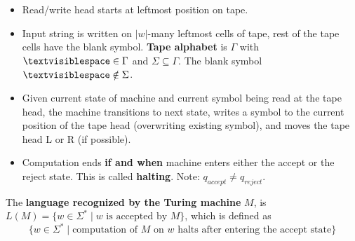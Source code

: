 \documentclass[12pt, oneside]{article}
\begin{document}
\vspace{-10pt}

\begin{itemize}
\setlength{\itemsep}{0pt}
\item Read/write head starts at leftmost position on tape. 
\item Input string is written on $|w|$-many leftmost cells of tape, 
rest of  the tape cells have  the blank symbol. {\bf Tape alphabet} 
is $\Gamma$ with $\textvisiblespace\in \Gamma$ and $\Sigma \subseteq \Gamma$.
The blank symbol $\textvisiblespace \notin \Sigma$.
\item Given current state of machine and current symbol being read at the tape head, 
the machine transitions to next state, writes a symbol to the current position  of the 
tape  head (overwriting existing symbol), and moves the tape head L or R (if possible). 
\item Computation ends {\bf if and when} machine enters either the accept or the reject state.
This is called {\bf halting}.
Note: $q_{accept} \neq q_{reject}$.
\end{itemize}

The {\bf language recognized by the  Turing machine} $M$,  is  $L(M) = \{ w \in \Sigma^* \mid w \textrm{ is accepted by } M\}$,
which is defined as
\[
  \{ w \in \Sigma^* \mid \textrm{computation of $M$ on $w$ halts after entering the accept state}\}
\]
\end{document}
